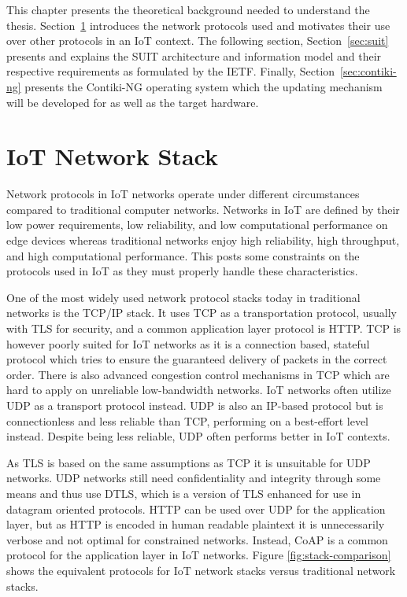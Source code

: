 \documentclass[0-thesis.tex]{subfiles}
\begin{document}
This chapter presents the theoretical background needed to understand the thesis.
Section~\ref{sec:network} introduces the network protocols used and motivates their use
over other protocols in an IoT context. The following section, Section~\ref{sec:suit}
presents and explains the SUIT architecture and information model and their respective
requirements as formulated by the IETF. Finally, Section~\ref{sec:contiki-ng} presents
the Contiki-NG operating system which the updating mechanism will be developed for as well
as the target hardware.

\section{IoT Network Stack}
\label{sec:network}
Network protocols in IoT networks operate under different circumstances compared to
traditional computer networks. Networks in IoT are defined by their low power
requirements, low reliability, and low computational performance on edge devices whereas
traditional networks enjoy high reliability, high throughput, and high computational
performance. This posts some constraints on the protocols used in IoT as they must
properly handle these characteristics.

One of the most widely used network protocol stacks today in traditional networks is the
TCP/IP stack. It uses TCP as a transportation protocol, usually with TLS for security, and
a common application layer protocol is HTTP. TCP is however poorly suited for IoT networks
as it is a connection based, stateful protocol which tries to ensure the guaranteed
delivery of packets in the correct order. There is also advanced congestion control
mechanisms in TCP which are hard to apply on unreliable low-bandwidth networks. IoT
networks often utilize UDP as a transport protocol instead. UDP is also an IP-based
protocol but is connectionless and less reliable than TCP, performing on a best-effort
level instead. Despite being less reliable, UDP often performs better in IoT contexts.

As TLS is based on the same assumptions as TCP it is unsuitable for UDP networks. UDP
networks still need confidentiality and integrity through some means and thus use DTLS,
which is a version of TLS enhanced for use in datagram oriented protocols. HTTP can be
used over UDP for the application layer, but as HTTP is encoded in human readable
plaintext it is unnecessarily verbose and not optimal for constrained networks. Instead,
CoAP is a common protocol for the application layer in IoT networks. Figure
\ref{fig:stack-comparison} shows the equivalent protocols for IoT network stacks versus
traditional network stacks. 
\end{document}
